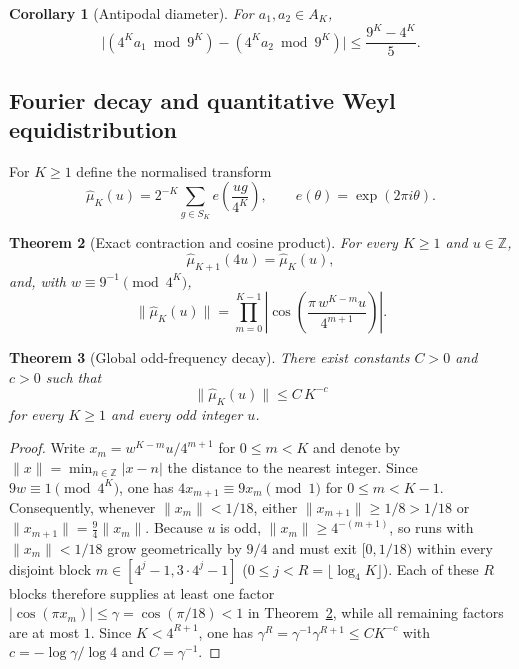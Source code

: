 \documentclass[11pt,a4paper]{article}
\newtheorem{theorem}{Theorem}[section]
\newtheorem{corollary}[theorem]{Corollary}
\theoremstyle{remark}
\newcommand{\Z}{\mathbb{Z}}
\begin{document}
\begin{corollary}[Antipodal diameter]
\label{cor:antipodal}
For $a_{1}, a_{2} \in A_{K}$,
\[
  \bigl|(4^{K} a_{1} \bmod 9^{K}) - (4^{K} a_{2} \bmod 9^{K})\bigr| \le \frac{9^{K} - 4^{K}}{5}.
\]
\end{corollary}

\subsection{Fourier decay and quantitative Weyl equidistribution}

For $K \ge 1$ define the normalised transform
\begin{equation}
  \hat\mu_{K}(u) = 2^{-K} \sum_{g \in S_{K}} e\!\left(\frac{u g}{4^{K}}\right), \qquad e(\theta) = \exp(2\pi i \theta).
\end{equation}

\begin{theorem}[Exact contraction and cosine product]
\label{thm:contraction}
For every $K \ge 1$ and $u \in \Z$,
\[
  \hat\mu_{K+1}(4u) = \hat\mu_{K}(u),
\]
and, with $w \equiv 9^{-1} \pmod{4^{K}}$,
\[
  \bigl\|\hat\mu_{K}(u)\bigr\|
  = \prod_{m=0}^{K-1} \left|\cos\!\left(\frac{\pi\, w^{K-m} u}{4^{m+1}}\right)\right|.
\]
\end{theorem}

\begin{theorem}[Global odd-frequency decay]
\label{thm:94global}
There exist constants $C > 0$ and $c > 0$ such that
\[
  \|\hat\mu_{K}(u)\| \le C\, K^{-c}
\]
for every $K \ge 1$ and every odd integer $u$.
\end{theorem}

\begin{proof}
Write $x_{m} = w^{K-m} u / 4^{m+1}$ for $0 \le m < K$ and denote by $\|x\| = \min_{n \in \Z} |x - n|$ the distance to the nearest integer. Since $9 w \equiv 1 \pmod{4^{K}}$, one has $4 x_{m+1} \equiv 9 x_{m} \pmod 1$ for $0 \le m < K - 1$. Consequently, whenever $\|x_{m}\| < 1/18$, either $\|x_{m+1}\| \ge 1/8 > 1/18$ or $\|x_{m+1}\| = \tfrac94 \|x_{m}\|$. Because $u$ is odd, $\|x_{m}\| \ge 4^{-(m+1)}$, so runs with $\|x_{m}\| < 1/18$ grow geometrically by $9/4$ and must exit $[0, 1/18)$ within every disjoint block $m \in [4^{j} - 1, 3 \cdot 4^{j} - 1]$ ($0 \le j < R = \lfloor \log_{4} K \rfloor$). Each of these $R$ blocks therefore supplies at least one factor $|\cos(\pi x_{m})| \le \gamma = \cos(\pi/18) < 1$ in Theorem~\ref{thm:contraction}, while all remaining factors are at most $1$. Since $K < 4^{R+1}$, one has $\gamma^{R} = \gamma^{-1} \gamma^{R+1} \le C K^{-c}$ with $c = -\log \gamma / \log 4$ and $C = \gamma^{-1}$.
\end{proof}
\end{document}
